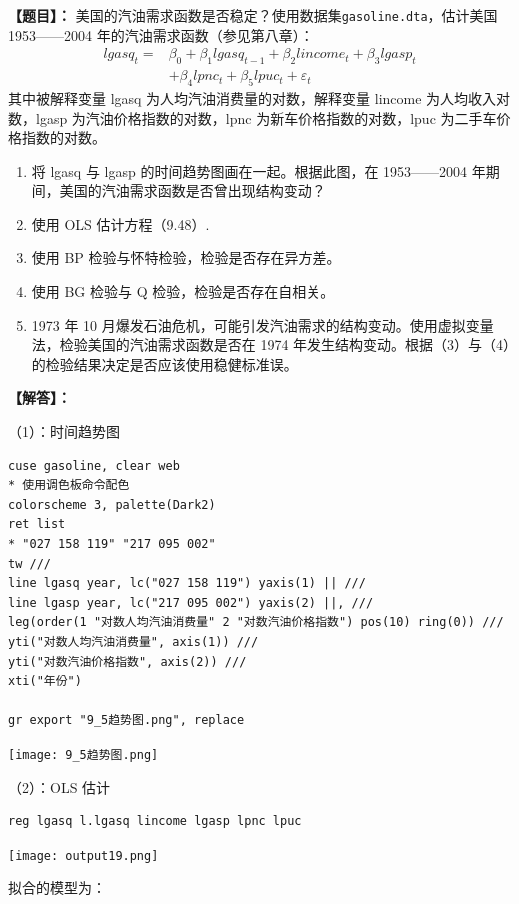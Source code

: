 \documentclass[cn,fancy,blue,11pt]{elegantbook}
\begin{document}
\textbf{【题目】：}
美国的汽油需求函数是否稳定？使用数据集\lstinline{gasoline.dta}，估计美国 1953------2004 年的汽油需求函数（参见第八章）：
\begin{align}
lgasq_t =& \beta_0 + \beta_1 lgasq_{t-1} + \beta_2lincome_t + \beta_3lgasp_t \\
& + \beta_4lpnc_t + \beta_5lpuc_t + \varepsilon_t
\end{align}
其中被解释变量 lgasq 为人均汽油消费量的对数，解释变量 lincome 为人均收入对数，lgasp 为汽油价格指数的对数，lpnc 为新车价格指数的对数，lpuc 为二手车价格指数的对数。

\begin{enumerate}
\item
  将 lgasq 与 lgasp 的时间趋势图画在一起。根据此图，在 1953------2004 年期间，美国的汽油需求函数是否曾出现结构变动？
\item
  使用 OLS 估计方程（9.48）.
\item
  使用 BP 检验与怀特检验，检验是否存在异方差。
\item
  使用 BG 检验与 Q 检验，检验是否存在自相关。
\item
  1973 年 10 月爆发石油危机，可能引发汽油需求的结构变动。使用虚拟变量法，检验美国的汽油需求函数是否在 1974 年发生结构变动。根据（3）与（4）的检验结果决定是否应该使用稳健标准误。
\end{enumerate}

\textbf{【解答】：}

（1）：时间趋势图

\begin{lstlisting}
cuse gasoline, clear web
* 使用调色板命令配色
colorscheme 3, palette(Dark2)
ret list
* "027 158 119" "217 095 002"
tw ///
line lgasq year, lc("027 158 119") yaxis(1) || ///
line lgasp year, lc("217 095 002") yaxis(2) ||, ///
leg(order(1 "对数人均汽油消费量" 2 "对数汽油价格指数") pos(10) ring(0)) ///
yti("对数人均汽油消费量", axis(1)) ///
yti("对数汽油价格指数", axis(2)) ///
xti("年份")

gr export "9_5趋势图.png", replace
\end{lstlisting}

\noindent\texttt{[image: 9\_5趋势图.png]}

（2）：OLS 估计

\begin{lstlisting}
reg lgasq l.lgasq lincome lgasp lpnc lpuc
\end{lstlisting}

\noindent\texttt{[image: output19.png]}

拟合的模型为：
\end{document}

